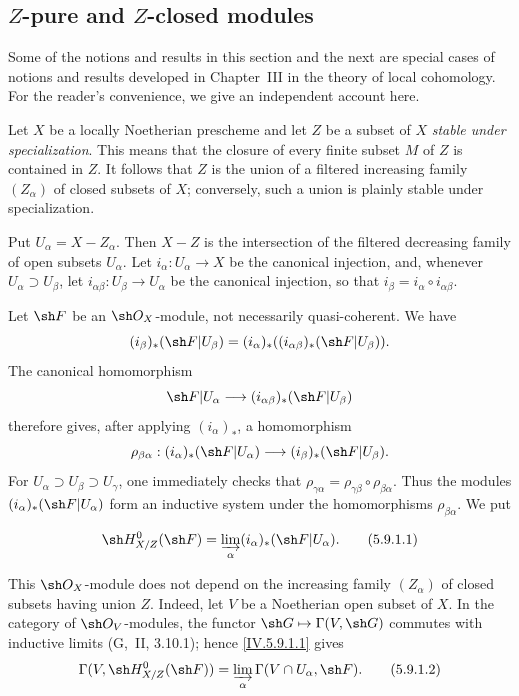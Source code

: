 \subsection{\texorpdfstring{$Z$}{Z}-pure and
\texorpdfstring{$Z$}{Z}-closed modules}
\label{subsection:IV.5.9}

Some of the notions and results in this section and the next are
special cases of notions and results developed in Chapter~III in the
theory of local cohomology.  For the reader's convenience, we give an
independent account here.

\begin{env}[5.9.1]
\label{IV.5.9.1}
Let $X$ be a locally Noetherian prescheme and let $Z$ be a subset of
$X$ \emph{stable under specialization}.  This means that the closure
of every finite subset $M$ of $Z$ is contained in $Z$.  It follows
that $Z$ is the union of a filtered increasing family $(Z_\alpha)$ of
closed subsets of $X$; conversely, such a union is plainly stable
under specialization.

Put $U_\alpha=X-Z_\alpha$.  Then $X-Z$ is the intersection of the
filtered decreasing family of open subsets $U_\alpha$.  Let
$i_\alpha:U_\alpha\to X$ be the canonical injection, and, whenever
$U_\alpha\supset U_\beta$, let
$i_{\alpha\beta}:U_\beta\to U_\alpha$ be the canonical injection, so
that $i_\beta=i_\alpha\circ i_{\alpha\beta}$.

Let $\sh F$ be an $\sh O_X$-module, not necessarily quasi-coherent.
We have
\[
 (i_\beta)_*(\sh F|U_\beta)
 = (i_\alpha)_*((i_{\alpha\beta})_*(\sh F|U_\beta)).
\]
The canonical homomorphism 
\[
  \sh F|U_\alpha\longrightarrow
  (i_{\alpha\beta})_*(\sh F|U_\beta)
\]
therefore gives, after applying $(i_\alpha)_*$, a homomorphism
\[
 \rho_{\beta\alpha}:
 (i_\alpha)_*(\sh F|U_\alpha)\longrightarrow
 (i_\beta)_*(\sh F|U_\beta).
\]
For $U_\alpha\supset U_\beta\supset U_\gamma$, one immediately
checks that
$\rho_{\gamma\alpha}=\rho_{\gamma\beta}\circ\rho_{\beta\alpha}$.
Thus the modules $(i_\alpha)_*(\sh F|U_\alpha)$ form an inductive
system under the homomorphisms $\rho_{\beta\alpha}$.  We put
\end{env}

\begin{equation}
\label{IV.5.9.1.1}
 \sh H^0_{X/Z}(\sh F)
 =\varinjlim_\alpha(i_\alpha)_*(\sh F|U_\alpha).
\tag{5.9.1.1}
\end{equation}

This $\sh O_X$-module does not depend on the increasing family
$(Z_\alpha)$ of closed subsets having union $Z$.  Indeed, let $V$ be
a Noetherian open subset of $X$.  In the category of
$\sh O_V$-modules, the functor
$\sh G\mapsto\Gamma(V,\sh G)$ commutes with inductive limits
(G,~II, 3.10.1); hence \eqref{IV.5.9.1.1} gives
\begin{equation}
\label{IV.5.9.1.2}
 \Gamma(V,\sh H^0_{X/Z}(\sh F))
 =\varinjlim_\alpha\Gamma(V\cap U_\alpha,\sh F).
\tag{5.9.1.2}
\end{equation}

